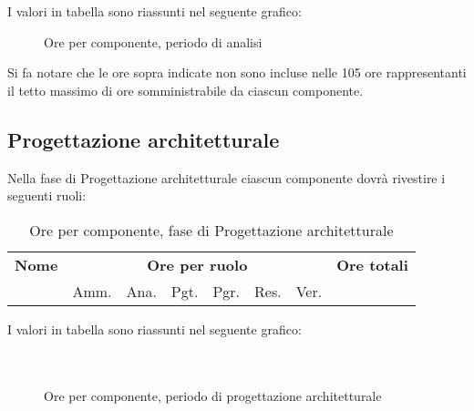 I valori in tabella sono riassunti nel seguente grafico: \\ 

\begin{figure}[H]
\caption{Ore per componente, periodo di analisi}
\end{figure}

Si fa notare che le ore sopra indicate non sono incluse nelle 105 ore rappresentanti il tetto massimo di ore somministrabile da ciascun componente.

\pagebreak
\subsection{Progettazione architetturale}

Nella fase di Progettazione architetturale ciascun componente dovrà rivestire i seguenti ruoli:

\begin{table}[H]
\centering
\begin{tabular}{lccccccc}
\toprule 
    \textbf{Nome}  & \multicolumn{6}{c}{\textbf{Ore per ruolo}} & \textbf{Ore totali} \\
     & Amm. & Ana. & Pgt. & Pgr. & Res. & Ver. \\
    \midrule
    
    	
    
    \bottomrule
\end{tabular}
\caption{Ore per componente, fase di Progettazione architetturale}
\end{table}
I valori in tabella sono riassunti nel seguente grafico: \\ \\ \\

\begin{figure}[H]
\caption{Ore per componente, periodo di progettazione architetturale}
\end{figure}

